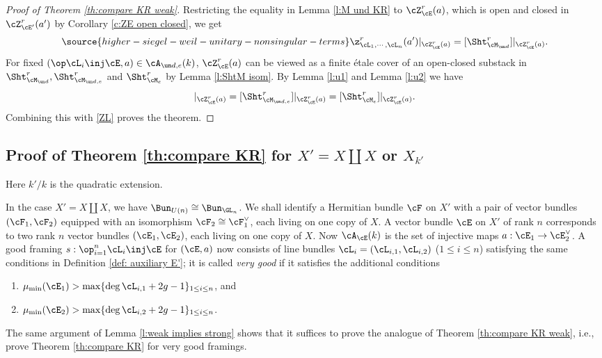 \begin{proof}[Proof of Theorem \ref{th:compare KR weak}] Restricting the equality in Lemma \ref{l:M und KR} to $\cZ_{\cE}^r(a)$, which is open and closed in $\cZ_{\cE'}^r(a')$ by Corollary \ref{c:ZE open closed}, we get
\begin{equation}\label{ZL}
\source{higher-siegel-weil-unitary-nonsingular-terms}
\z^r_{\cL_{1},\cdots, \cL_{n}}(a')|_{\cZ^r_{\cE}(a)}=[\Sht^{r}_{\cM_{\un d}}]|_{\cZ_{\cE}^r(a)}.
\end{equation}
For fixed $(\op\cL_{i}\inj \cE,a)\in \cA_{\un d,e}(k)$, $\cZ^{r}_{\cE}(a)$ can be viewed as a finite \'{e}tale cover of an open-closed substack in $\Sht^{r}_{\cM_{\un d}},\Sht^{r}_{\cM_{\un d,e}}$ and $\Sht^{r}_{\cM_{e}}$ by Lemma \ref{l:ShtM isom}. By Lemma \ref{l:u1} and Lemma \ref{l:u2} we have
\begin{equation}
[\Sht^{r}_{\cM_{\un d}}]|_{\cZ^r_{\cE}(a)}=[\Sht^{r}_{\cM_{\un d,e}}]|_{\cZ^r_{\cE}(a)}=[\Sht^{r}_{\cM_{e}}]|_{\cZ^{r}_{\cE}(a)}.
\end{equation}
Combining this with \eqref{ZL} proves the theorem.
\end{proof}


\subsection{Proof of Theorem \ref{th:compare KR} for $X'=X\coprod X$ or $X_{k'}$}\label{ss:compare cycle split} Here $k'/k$ is the quadratic extension.

In the case $X'=X\coprod X$,  we have $\Bun_{U(n)}\cong \Bun_{\GL_{n}}$. We shall identify a Hermitian bundle $\cF$ on $X'$ with a pair of vector bundles $(\cF_{1},\cF_{2})$ equipped with an isomorphism $\cF_{2}\cong \cF_{1}^{\vee}$, each living on one copy of $X$.  A vector bundle $\cE$ on $X'$ of rank $n$ corresponds to two rank $n$ vector bundles $(\cE_{1},\cE_{2})$, each living on one copy of $X$. Now $\cA_{\cE}(k)$ is the set of injective maps $a: \cE_{1}\to \cE^{\vee}_{2}$.  A good framing $s:\op_{i=1}^{n}\cL_{i}\inj \cE$ for $(\cE,a)$ now consists of line bundles $\cL_{i}=(\cL_{i,1}, \cL_{i,2})$ ($1\le i\le n$) satisfying the same conditions in Definition \ref{def: auxiliary E'}; it is called {\em very good} if it satisfies the additional conditions
\begin{enumerate}
\item[($3_{1}$)] $\mu_{\min}(\cE_{1})>\max\{\deg\cL_{i,1}+2g-1\}_{1\le i\le n}$, and
\item[($3_{2}$)] $\mu_{\min}(\cE_{2})>\max\{\deg\cL_{i,2}+2g-1\}_{1\le i\le n}$.
\end{enumerate}
The same argument of Lemma \ref{l:weak implies strong} shows that it suffices to prove the analogue of Theorem \ref{th:compare KR weak}, i.e., prove Theorem \ref{th:compare KR} for very good framings.

